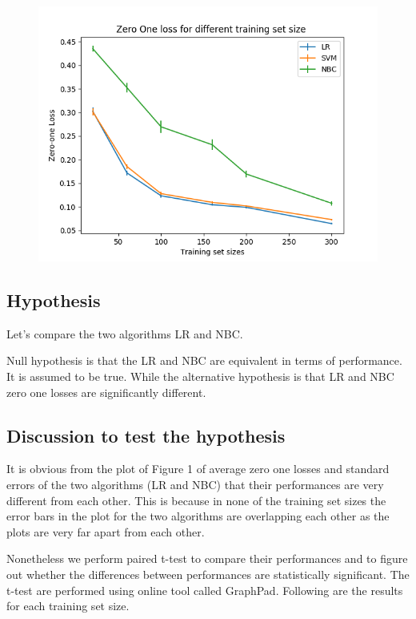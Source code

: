 \documentclass[12pt]{article}
\begin{document}
\begin{figure}
	\centering
	\includegraphics{AllModelsBinaryFeats.png}
\end{figure}

\subsection{Hypothesis}

Let's compare the two algorithms LR and NBC. 

Null hypothesis is that the LR and NBC are equivalent in terms of performance. It is assumed
to be true. While the alternative hypothesis is that LR and NBC zero one losses are significantly different.

\subsection{Discussion to test the hypothesis}

It is obvious from the plot of Figure 1 of average zero one losses and standard errors of the two
algorithms (LR and NBC) that their performances are very different from each other. This is because
in none of the training set sizes the error bars in the plot for the two algorithms are overlapping
each other as the plots are very far apart from each other.

Nonetheless we perform paired t-test to compare their performances and to figure out whether
the differences between performances are statistically significant. The t-test are performed using
online tool called GraphPad. Following are the results for each training set size.\\
\end{document}
